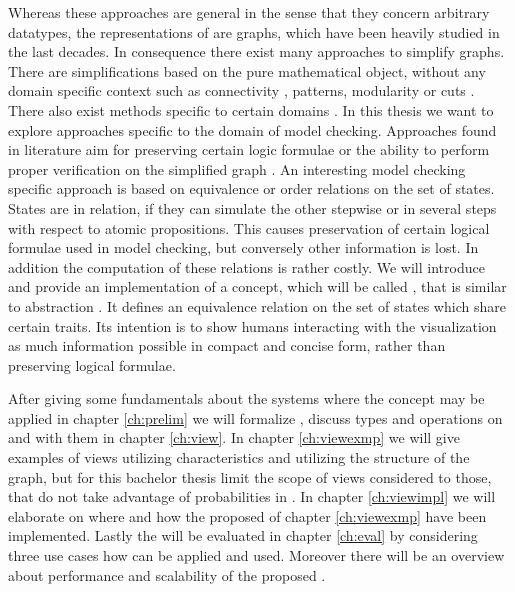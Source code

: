 \documentclass[preview]{standalone}
\begin{document}
Whereas these approaches are general in the sense that they concern arbitrary datatypes, the representations of \mdpsN are graphs, which have been heavily studied in the last decades. In consequence there exist many approaches to simplify graphs. There are simplifications based on the pure mathematical object, without any domain specific context such as connectivity \cite{Zhou2010}, patterns\cite{Soldano2014}, modularity \cite{Arenas2007} or cuts \cite{Goerke2009,Fung2011}. There also exist methods specific to certain domains \cite{Ruan2011,Li2022,Yaw2019}. In this thesis we want to explore approaches specific to the domain of model checking. Approaches found in literature aim for preserving certain logic formulae or the ability to perform proper verification on the simplified graph \cite{Rensink2012,Bonchi2013,Boneva2007}. An interesting model checking specific approach is based on equivalence or order relations on the set of states. States are in relation, if they can simulate the other stepwise or in several steps with respect to atomic propositions. This causes preservation of certain logical formulae used in model checking, but conversely other information is lost. In addition the computation of these relations is rather costly. We will introduce and provide an implementation of a concept, which will be called \viewN, that is similar to abstraction \cite[pp. 499]{Baier2008}. It defines an equivalence relation on the set of states which share certain traits. Its intention is to show humans interacting with the visualization as much information possible in compact and concise form, rather than preserving logical formulae.

After giving some fundamentals about the systems where the concept \viewN may be applied in chapter \ref{ch:prelim} we will formalize \viewsN, discuss types and operations on and with them in chapter \ref{ch:view}. In chapter \ref{ch:viewexmp} we will give examples of views utilizing \chgphN characteristics and \viewsN utilizing the structure of the \chgphN graph, but for this bachelor thesis limit the scope of views considered to those, that do not take advantage of probabilities in \chgphsN. In chapter \ref{ch:viewimpl} we will elaborate on where and how the proposed \viewsN of chapter \ref{ch:viewexmp} have been implemented. Lastly the \viewsN will be evaluated in chapter \ref{ch:eval} by considering three use cases how \viewsN can be applied and used. Moreover there will be an overview about performance and scalability of the proposed \viewsN. 
\end{document}
